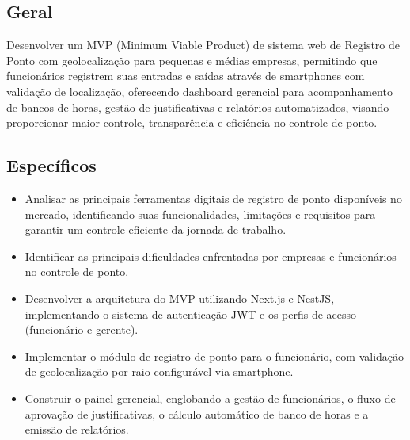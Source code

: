 \subsection{Geral}

Desenvolver um MVP (Minimum Viable Product) de sistema web de Registro de Ponto com geolocalização para pequenas e médias empresas, permitindo que funcionários registrem suas entradas e saídas através de smartphones com validação de localização, oferecendo dashboard gerencial para acompanhamento de bancos de horas, gestão de justificativas e relatórios automatizados, visando proporcionar maior controle, transparência e eficiência no controle de ponto.


\subsection{Específicos}
\begin{itemize}
    \item Analisar as principais ferramentas digitais de registro de ponto disponíveis no mercado, identificando suas funcionalidades, limitações e requisitos para garantir um controle eficiente da jornada de trabalho.
    \item Identificar as principais dificuldades enfrentadas por empresas e funcionários no controle de ponto.
    \item Desenvolver a arquitetura do MVP utilizando Next.js e NestJS, implementando o sistema de autenticação JWT e os perfis de acesso (funcionário e gerente).
    \item Implementar o módulo de registro de ponto para o funcionário, com validação de geolocalização por raio configurável via smartphone.
    \item Construir o painel gerencial, englobando a gestão de funcionários, o fluxo de aprovação de justificativas, o cálculo automático de banco de horas e a emissão de relatórios.
\end{itemize}

